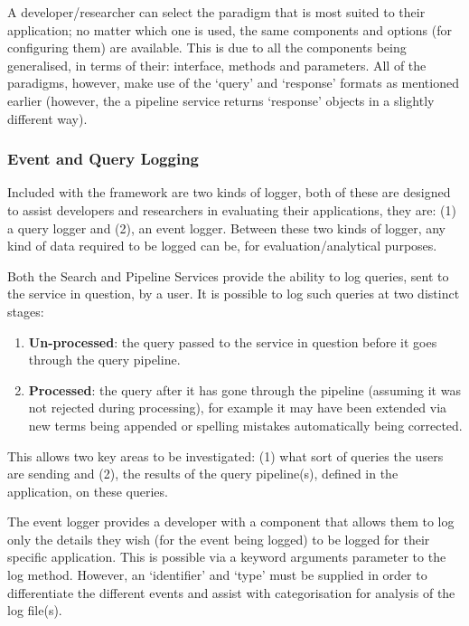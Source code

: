 \documentclass[letterpaper,10pt,english]{sphinxmanual}
\begin{document}
A developer/researcher can select the paradigm that is most suited to their application; no matter which one is used, the same components and options (for configuring them) are available. This is due to all the components being generalised, in terms of their: interface, methods and parameters. All of the paradigms, however, make use of the `query' and `response' formats as mentioned earlier (however, the a pipeline service returns `response' objects in a slightly different way).


\subsubsection{Event and Query Logging}
\label{overview:event-and-query-logging}
Included with the framework are two kinds of logger, both of these are designed to assist developers and researchers in evaluating their applications, they are: (1) a query logger and (2), an event logger. Between these two kinds of logger, any kind of data required to be logged can be, for evaluation/analytical purposes.

Both the Search and Pipeline Services provide the ability to log queries, sent to the service in question, by a user. It is possible to log such queries at two distinct stages:
\begin{enumerate}
\item {} 
\textbf{Un-processed}: the query passed to the service in question before it goes through the query pipeline.

\item {} 
\textbf{Processed}: the query after it has gone through the pipeline (assuming it was not rejected during processing), for example it may have been extended via new terms being appended or spelling mistakes automatically being corrected.

\end{enumerate}

This allows two key areas to be investigated: (1) what sort of queries the users are sending and (2), the results of the query pipeline(s), defined in the application, on these queries.

The event logger provides a developer with a component that allows them to log only the details they wish (for the event being logged) to be logged for their specific application. This is possible via a keyword arguments parameter to the log method. However, an `identifier' and `type' must be supplied in order to differentiate the different events and assist with categorisation for analysis of the log file(s).
\end{document}
